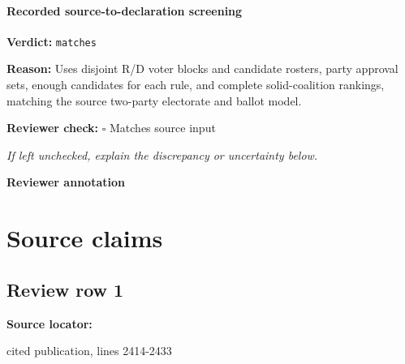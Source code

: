 \documentclass[10pt]{article}
\newcommand{\reviewerbox}{%
  \par\noindent\fbox{\parbox{0.96\linewidth}{\rule{0pt}{0.38in}}}\par
}
\newcommand{\reviewmatch}[1]{%
  \par\noindent\textbf{Reviewer check:} $\square$\; #1\par
  \noindent\emph{If left unchecked, explain the discrepancy or uncertainty below.}\par
}
\begin{document}
\paragraph{Recorded source-to-declaration screening}
\textbf{Verdict:} \texttt{matches}
\\
{\raggedright
\textbf{Reason:} Uses disjoint R/\allowbreak{}D voter blocks and candidate rosters, party approval sets, enough candidates for each rule, and complete solid-\allowbreak{}coalition rankings, matching the source two-\allowbreak{}party electorate and ballot model.\allowbreak{}
\par}
\reviewmatch{Matches source input}
\noindent\textbf{Reviewer annotation}\par
\reviewerbox

\clearpage
\hypertarget{source-claim-6ccc405fd526f01f}{}
\hypertarget{source-section-f10b5f68e4acf3dc}{}
\section*{Source claims}
\subsection*{Review row 1}
\textbf{Source locator:} {\footnotesize\raggedright cited publication, lines 2414-\allowbreak{}2433\par}
\end{document}
